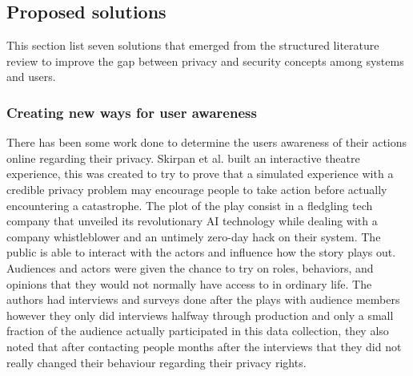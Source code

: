 \documentclass[conference]{IEEEtran}
\begin{document}

\subsection{Proposed solutions}

\par This section list seven solutions that emerged from the structured literature review to improve the gap between privacy and security concepts among systems and users.

\subsubsection{Creating new ways for user awareness}

There has been some work done to determine the users awareness of their actions
online regarding their privacy. Skirpan et al. \cite{SkirpanPrivacy} built
an interactive theatre experience, this was created to try to prove that
a simulated experience with a credible privacy problem may encourage people
to take action before actually encountering a catastrophe. The plot of the
play consist in a fledgling tech company that unveiled its revolutionary
AI technology while dealing with a company whistleblower and an untimely
zero-day hack on their system. The public is able to interact with the actors
and influence how the story plays out. Audiences and actors were given the
chance to try on roles, behaviors, and opinions that they would not normally
have access to in ordinary life. The authors had interviews and surveys done
after the plays with audience members however they only did interviews halfway
through production and only a small fraction of the audience actually participated
in this data collection, they also noted that after contacting people months
after the interviews that they did not really changed their behaviour regarding
their privacy rights.
\end{document}
